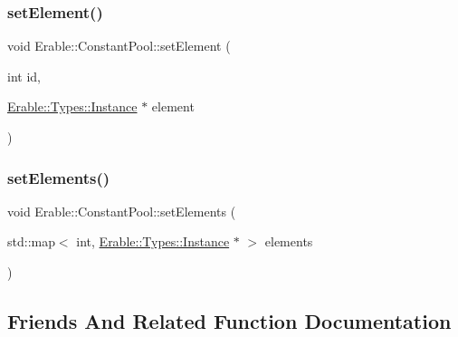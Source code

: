 \mbox{\label{class_erable_1_1_constant_pool_aeac06f9561bede54a4910dc6ec25dd0e}} 
\subsubsection{\texorpdfstring{setElement()}{setElement()}}
{\footnotesize\ttfamily void Erable\+::\+Constant\+Pool\+::set\+Element (\begin{DoxyParamCaption}\item[{int}]{id,  }\item[{\mbox{\hyperlink{class_erable_1_1_erable_1_1_types_1_1_instance}{Erable\+::\+Types\+::\+Instance}} $\ast$}]{element }\end{DoxyParamCaption})\hspace{0.3cm}{\ttfamily [inline]}}

\mbox{\label{class_erable_1_1_constant_pool_ac498e15605946f259ea08acd1bc07589}} 
\subsubsection{\texorpdfstring{setElements()}{setElements()}}
{\footnotesize\ttfamily void Erable\+::\+Constant\+Pool\+::set\+Elements (\begin{DoxyParamCaption}\item[{std\+::map$<$ int, \mbox{\hyperlink{class_erable_1_1_erable_1_1_types_1_1_instance}{Erable\+::\+Types\+::\+Instance}} $\ast$ $>$}]{elements }\end{DoxyParamCaption})\hspace{0.3cm}{\ttfamily [inline]}}



\subsection{Friends And Related Function Documentation}
\mbox{\label{class_erable_1_1_constant_pool_ab4af687e7e403b71e9f9e1a4d42909d7}} 
